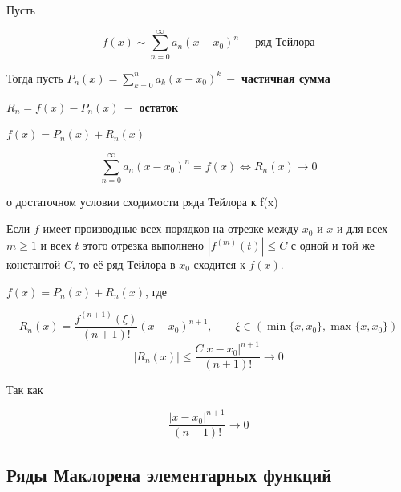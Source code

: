 \documentclass[12pt,a4paper]{article}
\begin{document}
\begin{definition}

    Пусть

    \[
        f(x) \sim \sum^\infty_{n=0}a_n(x - x_0)^n \ - \text{ряд Тейлора}
    \]

    Тогда пусть $P_n(x) = \sum_{k=0}^{n}a_k(x - x_0)^k \ - $ \textbf{частичная сумма}

    $R_n = f(x) - P_n(x) \ -$ \textbf{остаток}

    $f(x) = P_n(x) + R_n(x)$

\end{definition}

\begin{lemma}

    \[
        \sum^\infty_{n=0}a_n(x - x_0)^n = f(x) \Longleftrightarrow
        R_n(x) \longrightarrow 0
    \]

\end{lemma}

\begin{theorem}{о достаточном условии сходимости ряда Тейлора к f(x)}

    Если $f$ имеет производные всех порядков на отрезке между $x_0$ и $x$ и для всех $m\geq1$ и всех $t$ этого отрезка выполнено $|f^{(m)}(t)|\leq C$ с одной и той же константой $C$, то её ряд Тейлора в $x_0$ сходится к $f(x)$.

\end{theorem}

\begin{proofbox}{}

    $f(x) = P_n(x) + R_n(x)$, где

    \[
        R_n(x)=\frac{f^{(n+1)}(\xi)}{(n+1)!}(x-x_0)^{n+1},\qquad \xi\in(\min\{x,x_0\},\max\{x,x_0\})
    \]
    \[
        |R_n(x)|\leq\frac{C|x-x_0|^{n+1}}{(n+1)!}\longrightarrow0
    \]

    Так как

    \[
        \frac{|x - x_0|^{n+1}}{(n+1)!} \longrightarrow 0
    \]

\end{proofbox}

\subsection{Ряды Маклорена элементарных функций}
\end{document}
